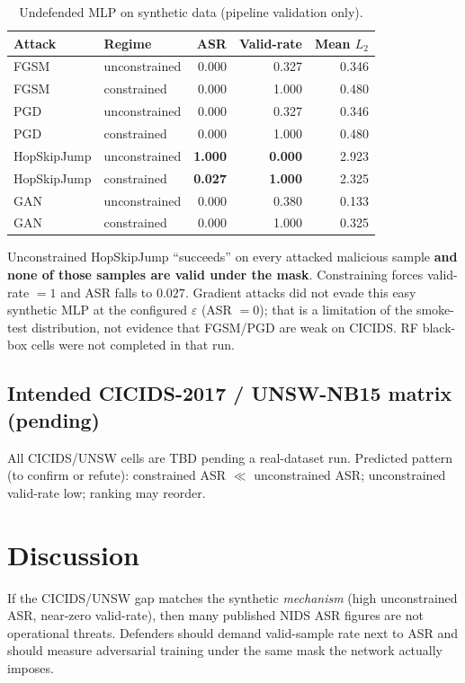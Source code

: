 \documentclass[11pt,a4paper]{article}
\begin{document}
\begin{table}[t]
\centering
\caption{Undefended MLP on synthetic data (pipeline validation only).}
\label{tab:synth}
\small
\begin{tabular}{llrrr}
\toprule
Attack & Regime & ASR & Valid-rate & Mean $L_2$ \\
\midrule
FGSM & unconstrained & 0.000 & 0.327 & 0.346 \\
FGSM & constrained & 0.000 & 1.000 & 0.480 \\
PGD & unconstrained & 0.000 & 0.327 & 0.346 \\
PGD & constrained & 0.000 & 1.000 & 0.480 \\
HopSkipJump & unconstrained & \textbf{1.000} & \textbf{0.000} & 2.923 \\
HopSkipJump & constrained & \textbf{0.027} & \textbf{1.000} & 2.325 \\
GAN & unconstrained & 0.000 & 0.380 & 0.133 \\
GAN & constrained & 0.000 & 1.000 & 0.325 \\
\bottomrule
\end{tabular}
\end{table}

Unconstrained HopSkipJump ``succeeds'' on every attacked malicious sample \textbf{and none of those samples are valid under the mask}. Constraining forces valid-rate $=1$ and ASR falls to $0.027$. Gradient attacks did not evade this easy synthetic MLP at the configured $\varepsilon$ (ASR $=0$); that is a limitation of the smoke-test distribution, not evidence that FGSM/PGD are weak on CICIDS. RF black-box cells were not completed in that run.

\subsection{Intended CICIDS-2017 / UNSW-NB15 matrix (pending)}
All CICIDS/UNSW cells are TBD pending a real-dataset run. Predicted pattern (to confirm or refute): constrained ASR $\ll$ unconstrained ASR; unconstrained valid-rate low; ranking may reorder.

\section{Discussion}
If the CICIDS/UNSW gap matches the synthetic \emph{mechanism} (high unconstrained ASR, near-zero valid-rate), then many published NIDS ASR figures are not operational threats. Defenders should demand valid-sample rate next to ASR and should measure adversarial training under the same mask the network actually imposes.
\end{document}
